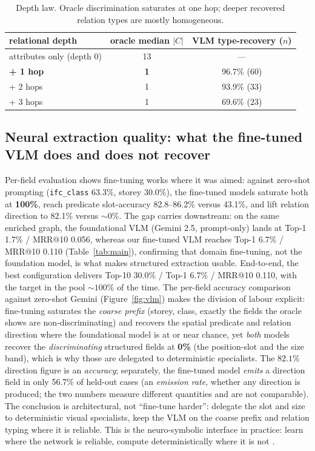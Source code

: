 \begin{table}[ht]
  \centering
  \begin{tabular}{lcc}
    \toprule
    relational depth & oracle median $|C|$ & VLM type-recovery ($n$) \\
    \midrule
    attributes only (depth 0) & 13 & --- \\
    \textbf{+ 1 hop} & \textbf{1} & 96.7\% ($60$) \\
    + 2 hops & 1 & 93.9\% ($33$) \\
    + 3 hops & 1 & 69.6\% ($23$) \\
    \bottomrule
  \end{tabular}
  \caption{Depth law. Oracle discrimination saturates at one hop; deeper recovered relation types are
  mostly homogeneous.}
  \label{tab:depth}
\end{table}

\subsection{Neural extraction quality: what the fine-tuned VLM does and does not recover}
\label{sec:eval-neural}

Per-field evaluation shows fine-tuning works where it was aimed: against zero-shot prompting
(\texttt{ifc\_class} 63.3\%, storey 30.0\%), the fine-tuned models saturate both at \textbf{100\%},
reach predicate slot-accuracy 82.8--86.2\% versus 43.1\%, and lift relation direction to 82.1\% versus
${\sim}0\%$. The gap carries downstream: on the same enriched graph, the foundational VLM (Gemini 2.5,
prompt-only) lands at Top-1 1.7\% / MRR@10 0.056, whereas our fine-tuned VLM reaches Top-1 6.7\% /
MRR@10 0.110 (Table~\ref{tab:main}), confirming that domain fine-tuning, not the foundation model, is
what makes structured extraction usable. End-to-end, the best configuration delivers
Top-10 30.0\% / Top-1 6.7\% / MRR@10 0.110, with the target in the pool ${\sim}100\%$ of the time.
The per-field accuracy comparison against zero-shot Gemini (Figure~\ref{fig:vlm}) makes the division
of labour explicit: fine-tuning saturates the \emph{coarse prefix} (storey, class, exactly the
fields the oracle shows are non-discriminating) and recovers the spatial predicate and relation
direction where the foundational model is at or near chance, yet \emph{both} models recover the
\emph{discriminating} structured fields at \textbf{0\%} (the position-slot and the size band), which
is why those are delegated to deterministic specialists. The $82.1\%$ direction figure is an
\emph{accuracy}; separately, the fine-tuned model \emph{emits} a direction field in only 56.7\% of
held-out cases (an \emph{emission rate}, whether any direction is produced; the two numbers measure
different quantities and are not comparable). The conclusion is
architectural, not ``fine-tune harder'': delegate the slot and size to deterministic visual
specialists, keep the VLM on the coarse prefix and relation typing where it is reliable. This is the
neuro-symbolic interface in practice: learn where the network is reliable, compute
deterministically where it is not \citep{mao2019nscl}.

